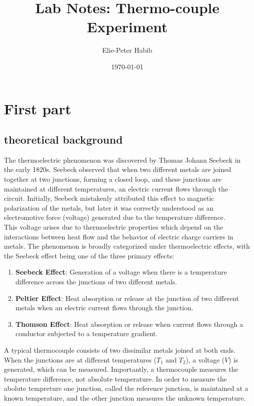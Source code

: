 \documentclass[12pt,a4paper]{report}
\title{Lab Notes: Thermo-couple Experiment}
\author{Elie-Peter Habib}
\date{\today}
\begin{document}
\maketitle

\tableofcontents
\pagebreak

\chapter{First part}


\section{theoretical background}

The thermoelectric phenomenon was discovered by Thomas Johann Seebeck in the early 1820s. Seebeck observed that when two different metals are joined together at two junctions, forming a closed loop, and these junctions are maintained at different temperatures, an electric current flows through the circuit. Initially, Seebeck mistakenly attributed this effect to magnetic polarization of the metals, but later it was correctly understood as an electromotive force (voltage) generated due to the temperature difference.
\\

This voltage arises due to thermoelectric properties which depend on the interactions between heat flow and the behavior of electric charge carriers in metals. The phenomenon is broadly categorized under thermoelectric effects, with the Seebeck effect being one of the three primary effects:

\begin{enumerate}
    \item \textbf{Seebeck Effect}: Generation of a voltage when there is a temperature difference across the junctions of two different metals.
    \item \textbf{Peltier Effect}: Heat absorption or release at the junction of two different metals when an electric current flows through the junction.
    \item \textbf{Thomson Effect}: Heat absorption or release when current flows through a conductor subjected to a temperature gradient.
\end{enumerate}

A typical thermocouple consists of two dissimilar metals joined at both ends. When the junctions are at different temperatures ($T_1$ and $T_2$), a voltage ($V$) is generated, which can be measured. Importantly, a thermocouple measures the temperature difference, not absolute temperature. In order to measure the abolute tempreture one junction, called the reference junction, is maintained at a known temperature, and the other junction measures the unknown temperature.
\end{document}
